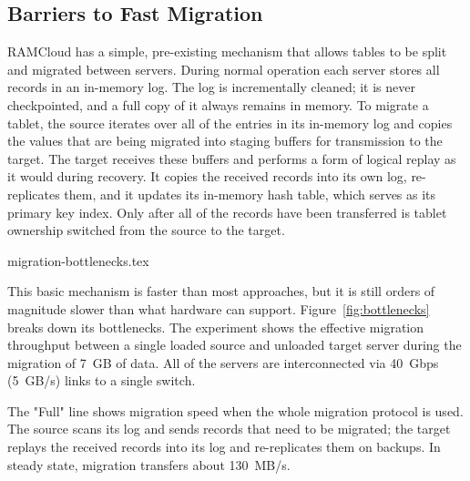 \subsection{Barriers to Fast Migration}
\label{sec:bottlenecks}

RAMCloud has a simple, pre-existing mechanism that allows tables to be split
and migrated between servers.
During normal operation each server stores
all records in an in-memory log. The log is incrementally cleaned; it is
never checkpointed, and a full copy of it always remains in memory.
To migrate a tablet,
the source iterates over all of the entries in its
in-memory log and copies the values that are being migrated into staging buffers for
transmission to the target. The target receives these buffers and performs a
form of logical replay as it would during recovery. It copies the received
records into its own log, re-replicates them, and it updates its in-memory hash
table, which serves as its primary key index. Only after all of the records
have been transferred is tablet ownership switched from the source to
the target.

 {migration-bottlenecks.tex}

This basic mechanism is faster than most
approaches,
but it is still orders of
magnitude slower than what hardware can support.  Figure~\ref{fig:bottlenecks}
breaks down its bottlenecks. The
experiment shows the effective migration throughput between a single loaded
source and unloaded target server during the migration of
7~GB of data.  All of the servers are interconnected via 40~Gbps (5~GB/s) links
to a single switch.

The "Full" line shows migration speed when the whole migration
protocol is used. The source scans its log and sends records that need to
be migrated; the target replays the received records into its log and
re-replicates them on backups.
In steady state, migration transfers about 130~MB/s.

